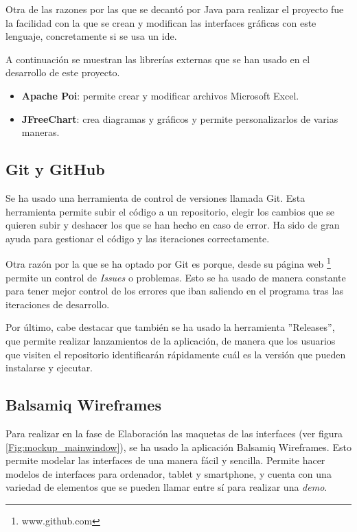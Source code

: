 Otra de las razones por las que se decantó por Java para realizar el proyecto fue la facilidad con la que se crean y modifican las interfaces gráficas con este lenguaje, concretamente si se usa un \gls{ide}.

A continuación se muestran las librerías externas que se han usado en el desarrollo de este proyecto.
\begin{itemize}
	\item \textbf{Apache Poi}: permite crear y modificar archivos Microsoft Excel\cite{apachepoi}.
	\item \textbf{JFreeChart}: crea diagramas y gráficos y permite personalizarlos de varias maneras\cite{jfreechart}.
\end{itemize}

\subsection{Git y GitHub}
Se ha usado una herramienta de control de versiones llamada Git\cite{git}. Esta herramienta permite subir el código a un repositorio, elegir los cambios que se quieren subir y deshacer los que se han hecho en caso de error. Ha sido de gran ayuda para gestionar el código y las iteraciones correctamente.

Otra razón por la que se ha optado por Git es porque, desde su página web \footnote{www.github.com} permite un control de \textit{Issues} o problemas. Esto se ha usado de manera constante para tener mejor control de los errores que iban saliendo en el programa tras las iteraciones de desarrollo.

Por último, cabe destacar que también se ha usado la herramienta ''Releases''\cite{githubreleases}, que permite realizar lanzamientos de la aplicación, de manera que los usuarios que visiten el repositorio identificarán rápidamente cuál es la versión que pueden instalarse y ejecutar.


\subsection{Balsamiq Wireframes}
\label{sub:balsamiq}
Para realizar en la fase de Elaboración las maquetas de las interfaces (ver figura \ref{Fig:mockup_mainwindow}), se ha usado la aplicación Balsamiq Wireframes\cite{balsamiq}. Esto permite modelar las interfaces de una manera fácil y sencilla. Permite hacer modelos de interfaces para ordenador, tablet y smartphone, y cuenta con una variedad de elementos que se pueden llamar entre sí para realizar una \textit{demo}.

